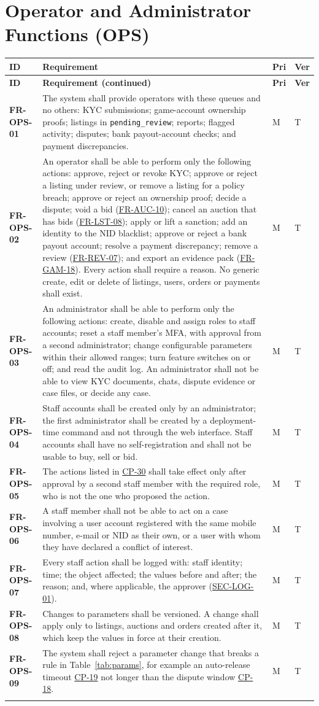 \documentclass[11pt,a4paper]{report}
\makeatletter
\newenvironment{reqs}{%
  \small
  \begin{longtable}{@{}>{\raggedright\arraybackslash}p{2.35cm}
                       >{\raggedright\arraybackslash}p{10.3cm}
                       >{\centering\arraybackslash}p{0.7cm}
                       >{\centering\arraybackslash}p{0.7cm}@{}}
  \toprule
  \textbf{ID} & \textbf{Requirement} & \textbf{Pri} & \textbf{Ver} \\
  \midrule
  \endfirsthead
  \toprule
  \textbf{ID} & \textbf{Requirement (continued)} & \textbf{Pri} & \textbf{Ver} \\
  \midrule
  \endhead
  \bottomrule
  \endfoot
}{\end{longtable}}
\newcommand{\req}[5]{\leavevmode\textbf{#1}\hypertarget{#1}{} & #5 & #2 & #3 \\ \addlinespace[2pt]}
\newcommand{\rr}[1]{\hyperlink{#1}{#1}}
\newcommand{\cp}[1]{\hyperlink{#1}{#1}}
\makeatother
\begin{document}
\section{Operator and Administrator Functions (OPS)}
\label{sec:fr-ops}
\begin{reqs}
\req{FR-OPS-01}{M}{T}{FR-91}{The system shall provide operators with these queues and no others: KYC submissions; game-account ownership proofs; listings in \texttt{pending\_review}; reports; flagged activity; disputes; bank payout-account checks; and payment discrepancies.}
\req{FR-OPS-02}{M}{T}{FR-91}{An operator shall be able to perform only the following actions: approve, reject or revoke KYC; approve or reject a listing under review, or remove a listing for a policy breach; approve or reject an ownership proof; decide a dispute; void a bid (\rr{FR-AUC-10}); cancel an auction that has bids (\rr{FR-LST-08}); apply or lift a sanction; add an identity to the NID blacklist; approve or reject a bank payout account; resolve a payment discrepancy; remove a review (\rr{FR-REV-07}); and export an evidence pack (\rr{FR-GAM-18}). Every action shall require a reason. No generic create, edit or delete of listings, users, orders or payments shall exist.}
\req{FR-OPS-03}{M}{T}{new}{An administrator shall be able to perform only the following actions: create, disable and assign roles to staff accounts; reset a staff member's MFA, with approval from a second administrator; change configurable parameters within their allowed ranges; turn feature switches on or off; and read the audit log. An administrator shall not be able to view KYC documents, chats, dispute evidence or case files, or decide any case.}
\req{FR-OPS-04}{M}{T}{new}{Staff accounts shall be created only by an administrator; the first administrator shall be created by a deployment-time command and not through the web interface. Staff accounts shall have no self-registration and shall not be usable to buy, sell or bid.}
\req{FR-OPS-05}{M}{T}{new}{The actions listed in \cp{CP-30} shall take effect only after approval by a second staff member with the required role, who is not the one who proposed the action.}
\req{FR-OPS-06}{M}{T}{new}{A staff member shall not be able to act on a case involving a user account registered with the same mobile number, e-mail or NID as their own, or a user with whom they have declared a conflict of interest.}
\req{FR-OPS-07}{M}{T}{new}{Every staff action shall be logged with: staff identity; time; the object affected; the values before and after; the reason; and, where applicable, the approver (\rr{SEC-LOG-01}).}
\req{FR-OPS-08}{M}{T}{new}{Changes to parameters shall be versioned. A change shall apply only to listings, auctions and orders created after it, which keep the values in force at their creation.}
\req{FR-OPS-09}{M}{T}{new}{The system shall reject a parameter change that breaks a rule in Table~\ref{tab:params}, for example an auto-release timeout \cp{CP-19} not longer than the dispute window \cp{CP-18}.}
\end{reqs}
\end{document}
